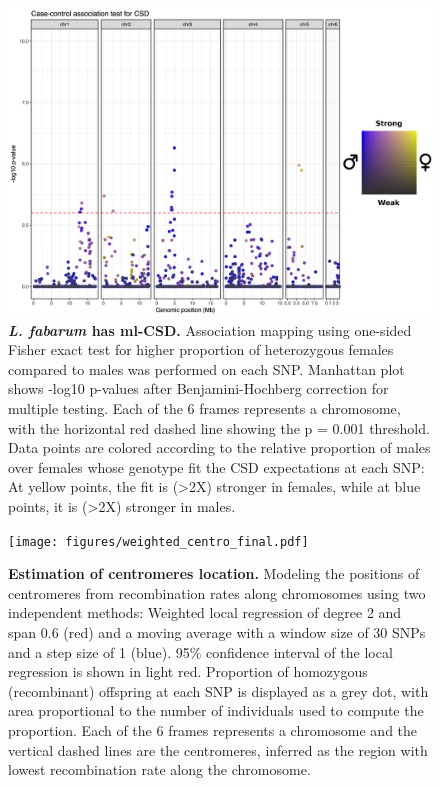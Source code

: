 \documentclass[11pt,a4paper]{report}
\begin{document}
\begin{figure}[!htb]
  \centering
  \includegraphics[width=1\textwidth]{figures/assoc_colmap_final.png}
  \caption{\textbf{\textit{L. fabarum} has ml-CSD.} Association mapping using one-sided Fisher exact test for higher proportion of heterozygous females compared to males was performed on each SNP. Manhattan plot shows -log10 p-values after Benjamini-Hochberg correction for multiple testing. Each of the 6 frames represents a chromosome, with the horizontal red dashed line showing the p = 0.001 threshold. Data points are colored according to the relative proportion of males over females whose genotype fit the CSD expectations at each SNP: At yellow points, the fit is (>2X) stronger in females, while at blue points, it is (>2X) stronger in males.}
  \label{assoc}
\end{figure}

\begin{figure}[!ht]
  \centering
  \texttt{[image: figures/weighted\_centro\_final.pdf]}
  \caption{\textbf{Estimation of centromeres location.} Modeling the positions of centromeres from recombination rates along chromosomes using two independent methods: Weighted local regression of degree 2 and span 0.6 (red) and a moving average with a window size of 30 SNPs and a step size of 1 (blue). 95\% confidence interval of the local regression is shown in light red. Proportion of homozygous (recombinant) offspring at each SNP is displayed as a grey dot, with area proportional to the number of individuals used to compute the proportion. Each of the 6 frames represents a chromosome and the vertical dashed lines are the centromeres, inferred as the region with lowest recombination rate along the chromosome.}
  \label{centro}
\end{figure}
\end{document}
